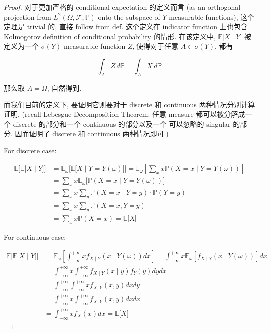 \documentclass{qlnotes-export}
\begin{document}
\begin{proof}

对于更加严格的 conditional expectation 的定义而言 (as an orthogonal projection from \(L^{2}(\Omega,\mathcal{F},{\mathbb{P}})\) onto the subspace of \(Y\)-measurable functions), 这个定理是 trivial 的, 直接 follow from def. 这个定义在 indicator function 上也包含 \href{https://qiulinfan.github.io/notes/math/probability/\#kn-kolmogorov-definition-of-conditional-probability}{Kolmogorov definition of conditional probability} 的情形. 在该定义中, \(\left. {\mathbb{E}}\lbrack X \middle| Y\rbrack \right.\) 被定义为一个 \(\sigma(Y)\)-measurable function \(Z\), 使得对于任意 \(A \in \sigma(Y)\), 都有

\[\int_{A}Z\, d{\mathbb{P}} = \int_{A}X\, d{\mathbb{P}}\]

那么取 \(A = \Omega\), 自然得到.

而我们目前的定义下, 要证明它则要对于 discrete 和 continuous 两种情况分别计算证明. (recall Lebesgue Decomposition Theorem: 任意 measure 都可以被分解成一个 discrete 的部分和一个 continuous 的部分以及一个 可以忽略的 singular 的部分. 因而证明了 discrete 和 continuous 两种情况即可.)

For discrete case:

\[\begin{matrix}
{{\mathbb{E}}\lbrack{\mathbb{E}}\lbrack X \mid Y\rbrack\rbrack} & {= {\mathbb{E}}_{\omega}\lbrack{\mathbb{E}}\lbrack X \mid Y = Y(\omega)\rbrack\rbrack = {\mathbb{E}}_{\omega}\left\lbrack {\sum\limits_{x}x{\mathbb{P}}(X = x \mid Y = Y(\omega))} \right\rbrack} \\
 & {= \sum\limits_{x}x{\mathbb{E}}_{\omega}\lbrack{\mathbb{P}}(X = x \mid Y = Y(\omega))\rbrack} \\
 & {= \sum\limits_{x}x\sum\limits_{y}{\mathbb{P}}(X = x \mid Y = y) \cdot {\mathbb{P}}(Y = y)} \\
 & {= \sum\limits_{x}x\sum\limits_{y}{\mathbb{P}}(X = x,Y = y)} \\
 & {= \sum\limits_{x}x{\mathbb{P}}(X = x) = {\mathbb{E}}\lbrack X\rbrack}
\end{matrix}\]

For continuous case:

\[\begin{matrix}
{{\mathbb{E}}\lbrack{\mathbb{E}}\lbrack X \mid Y\rbrack\rbrack} & {= {\mathbb{E}}_{\omega}\left\lbrack {\int_{- \infty}^{+ \infty}xf_{X \mid Y}(x \mid Y(\omega))dx} \right\rbrack = \int_{- \infty}^{+ \infty}x{\mathbb{E}}_{\omega}\left\lbrack {f_{X \mid Y}(x \mid Y(\omega))} \right\rbrack dx} \\
 & {= \int_{- \infty}^{+ \infty}x\int_{- \infty}^{+ \infty}f_{X \mid Y}(x \mid y)f_{Y}(y)dydx} \\
 & {= \int_{- \infty}^{+ \infty}\int_{- \infty}^{+ \infty}xf_{X,Y}(x,y)dxdy} \\
 & {= \int_{- \infty}^{+ \infty}x\int_{- \infty}^{+ \infty}f_{X,Y}(x,y)dxdx} \\
 & {= \int_{- \infty}^{+ \infty}xf_{X}(x)dx = {\mathbb{E}}\lbrack X\rbrack}
\end{matrix}\]

\end{proof}
\end{document}
